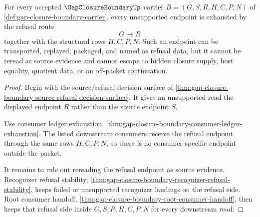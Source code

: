 \begin{theorem}
\label{thm:gap-closure-boundary-refusal-ledger-routing-exhaustion}
For every accepted $\GapClosureBoundaryUp$ carrier $B=(G,S,R,H,C,P,N)$ of \autoref{def:gap-closure-boundary-carrier}, every unsupported endpoint is exhausted by the refusal route
$$
G \longrightarrow R
$$
together with the structural rows $H,C,P,N$. Such an endpoint can be transported, replayed, packaged, and named as refusal data, but it cannot be reread as source evidence and cannot escape to hidden closure supply, host equality, quotient data, or an off-packet continuation.
\end{theorem}
\begin{proof}
Begin with the source/refusal decision surface of \autoref{thm:gap-closure-boundary-source-refusal-decision-surface}. It gives an unsupported read the displayed endpoint $R$ rather than the source endpoint $S$.

Use consumer ledger exhaustion, \autoref{thm:gap-closure-boundary-consumer-ledger-exhaustion}. The listed downstream consumers receive the refusal endpoint through the same rows $H,C,P,N$, so there is no consumer-specific endpoint outside the packet.

It remains to rule out rereading the refusal endpoint as source evidence. Recognizer refusal stability, \autoref{thm:gap-closure-boundary-recognizer-refusal-stability}, keeps failed or unsupported recognizer landings on the refusal side. Root consumer handoff, \autoref{thm:gap-closure-boundary-root-consumer-handoff}, then keeps that refusal side inside $G,S,R,H,C,P,N$ for every downstream read.
\end{proof}

